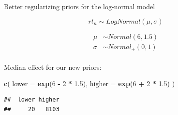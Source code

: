 \documentclass[12pt,ignorenonframetext,aspectratio=169]{beamer}
\newenvironment{Shaded}{\begin{snugshade}}{\end{snugshade}}
\newcommand{\DataTypeTok}[1]{\textcolor[rgb]{0.13,0.29,0.53}{#1}}
\newcommand{\DecValTok}[1]{\textcolor[rgb]{0.00,0.00,0.81}{#1}}
\newcommand{\FloatTok}[1]{\textcolor[rgb]{0.00,0.00,0.81}{#1}}
\newcommand{\KeywordTok}[1]{\textcolor[rgb]{0.13,0.29,0.53}{\textbf{#1}}}
\newcommand{\NormalTok}[1]{#1}
\newcommand{\OperatorTok}[1]{\textcolor[rgb]{0.81,0.36,0.00}{\textbf{#1}}}
\newcommand{\StringTok}[1]{\textcolor[rgb]{0.31,0.60,0.02}{#1}}
\begin{document}
\begin{frame}{Better regularizing priors for the log-normal model}
\protect\hypertarget{better-regularizing-priors-for-the-log-normal-model}{}

\begin{equation}
rt_n \sim LogNormal(\mu,\sigma)
\end{equation}

\begin{equation}
\begin{aligned}
\mu &\sim Normal(6, 1.5) \\
\sigma &\sim Normal_+(0, 1) \\
\end{aligned}
\label{eq:logpriorsnorm}
\end{equation}

\end{frame}

\begin{frame}[fragile]

\begin{block}{Median effect for our new priors:}

\small

\begin{Shaded}
\begin{Highlighting}[]
\KeywordTok{c}\NormalTok{(}
  \DataTypeTok{lower =} \KeywordTok{exp}\NormalTok{(}\DecValTok{6} \OperatorTok{-}\StringTok{ }\DecValTok{2} \OperatorTok{*}\StringTok{ }\FloatTok{1.5}\NormalTok{),}
  \DataTypeTok{higher =} \KeywordTok{exp}\NormalTok{(}\DecValTok{6} \OperatorTok{+}\StringTok{ }\DecValTok{2} \OperatorTok{*}\StringTok{ }\FloatTok{1.5}\NormalTok{)}
\NormalTok{)}
\end{Highlighting}
\end{Shaded}

\begin{verbatim}
##  lower higher 
##     20   8103
\end{verbatim}

\normalsize

\end{block}

\end{frame}
\end{document}
